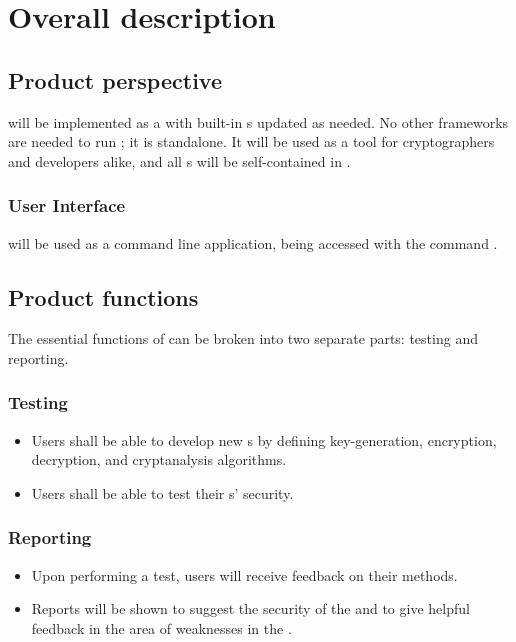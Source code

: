 \section{Overall description}
\dd


\subsection{Product perspective}

\cry{} will be implemented as a \cf{} with built-in \cs s
updated as needed. No other frameworks are needed to run
\cry; it is standalone. It will be used as a
tool for cryptographers and developers alike, and all \cs s
will be self-contained in \cry.

\subsubsection{User Interface}
\cry{} will be used as a command line application, being
accessed with the command .


\subsection{Product functions}

The essential functions of \cry{} can be broken into two
separate parts: testing and reporting.

\subsubsection{Testing}
\begin{itemize}
\item Users shall be able to develop new \cs s{}
  by defining key-generation, encryption, decryption,
  and cryptanalysis algorithms.
\item Users shall be able to test their \cs s' security.
\end{itemize}

\subsubsection{Reporting}
\begin{itemize}
  \item Upon performing a test, users will receive feedback on their methods.
  \item Reports will be shown to suggest the security of the \cs and to give helpful feedback
  in the area of weaknesses in the \cs.
\end{itemize}


